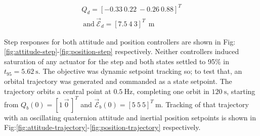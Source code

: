 \documentclass[a4paper, 10pt, conference]{ieeeconf}
\begin{document}
\begin{multline}\label{eq:start-setpoint}
Q_d=[-0.33~0.22~-0.26~0.88]^T\\~\text{and}~\vec{\mathcal{E}}_d=[7.5~4~3]^T~~\text{m}
\end{multline}
\par
Step responses for both attitude and position controllers are shown in Fig:\ref{fig:attitude-step}-\ref{fig:position-step} respectively. Neither controllers induced saturation of any actuator for the step and both states settled to 95\% in $t_{95}=5.62~\text{s}$. The objective was dynamic setpoint tracking so; to test that, an orbital trajectory was generated and commanded as a state setpoint. The trajectory orbits a central point at $0.5~\text{Hz}$, completing one orbit in $120~\text{s}$, starting from $Q_b(0)=[1~\vec{0}\hspace{2pt}]^T$ and $\vec{\mathcal{E}}_b(0)=[5~5~5]^T~\text{m}$. Tracking of that trajectory with an oscillating quaternion attitude and inertial position setpoints is shown in Fig:\ref{fig:attitude-trajectory}-\ref{fig:position-trajectory} respectively.
\end{document}
